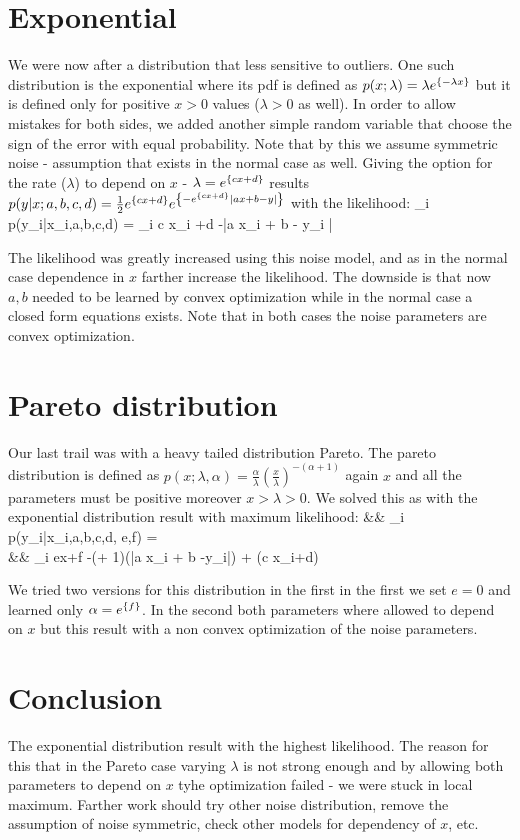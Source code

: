 \documentclass{article}
\begin{document}
\section{Exponential}
We were now after a distribution that less sensitive to outliers.
One such distribution is the exponential where its pdf is defined as $p(x;\lambda) = \lambda e^{\left\{-\lambda x\right\}}$ but it is defined only for positive $x>0$ values ($\lambda >0$ as well).
In order to allow mistakes for both sides, we added another simple random variable that choose the sign of the error with equal probability.
Note that by this we assume symmetric noise - assumption that exists in the normal case as well.
Giving the option for the rate ($\lambda$) to depend on $x$ - $\lambda = e^{\left\{cx + d\right\}}$ results $p(y|x;a,b,c,d) = \frac{1}{2}e^{\left\{cx+d\right\}}e^{\left\{-e^{\left\{cx+d\right\}}|ax+b-y|\right\}} $ with the likelihood:
\be
{} \sum_i \log p(y_i|x_i,a,b,c,d) =  \sum_i c x_i +d -|a x_i  + b - y_i |
\ee

The likelihood was greatly increased using this noise model, and as in the normal case dependence in $x$ farther increase the likelihood.
The downside is that now $a,b$ needed to be learned by convex optimization while in the normal case a closed form equations exists.
Note that in both cases the noise parameters are convex optimization.

\section{Pareto distribution}
Our last trail was with a heavy tailed distribution Pareto.
The pareto distribution is defined as $p(x;\lambda, \alpha) = \frac{\alpha}{\lambda}\left(\frac{x}{\lambda}\right)^{-(\alpha +1)}$ again $x$ and all the parameters must be positive moreover $x>\lambda>0$. We solved this as with the exponential distribution result with maximum likelihood:
\bea
&& \sum_i \log p(y_i|x_i,a,b,c,d, e,f) = \\
&& \sum_i ex+f -(+ 1)\log(|a x_i + b -y_i|) + (c x_i+d)
\eea

We tried two versions for this distribution in the first in the first we set $e=0$ and learned only $\alpha = e^{\left\{f\right\}}$.
In the second both parameters where allowed to depend on $x$ but this result with a non convex optimization of the noise parameters.

\section{Conclusion}
The exponential distribution result with the highest likelihood.
The reason for this that in the Pareto case varying $\lambda$ is not strong enough and by allowing both parameters to depend on $x$ tyhe optimization failed - we were stuck in local maximum.
Farther work should try other noise distribution, remove the assumption of noise symmetric, check other models for dependency of $x$, etc.
\end{document}
